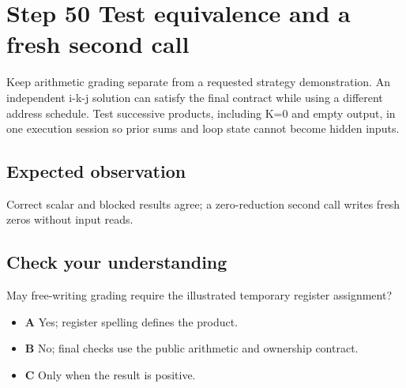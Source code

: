 \section{Step 50 Test equivalence and a fresh second call}\label{matmul-s50}

Keep arithmetic grading separate from a requested strategy demonstration. An independent i-k-j solution can satisfy the final contract while using a different address schedule. Test successive products, including K=0 and empty output, in one execution session so prior sums and loop state cannot become hidden inputs.

\subsection{Expected observation}
Correct scalar and blocked results agree; a zero-reduction second call writes fresh zeros without input reads.

\subsection{Check your understanding}
May free-writing grading require the illustrated temporary register assignment?

\begin{itemize}
\item \textbf{A} Yes; register spelling defines the product.
\item \textbf{B} No; final checks use the public arithmetic and ownership contract.
\item \textbf{C} Only when the result is positive.
\end{itemize}
